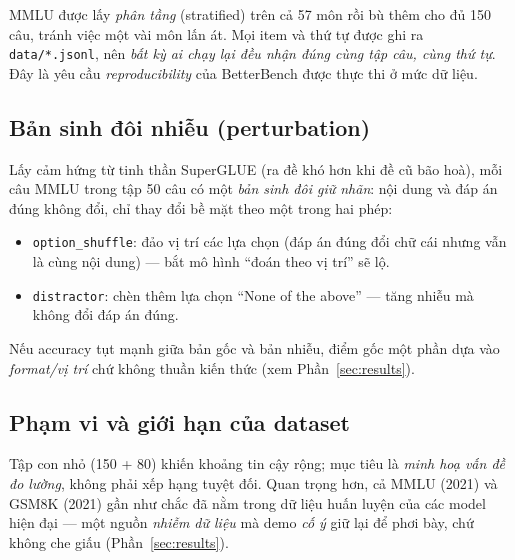 MMLU được lấy \emph{phân tầng} (stratified) trên cả 57 môn rồi bù thêm cho đủ 150
câu, tránh việc một vài môn lấn át. Mọi item và thứ tự được ghi ra
\texttt{data/*.jsonl}, nên \emph{bất kỳ ai chạy lại đều nhận đúng cùng tập câu, cùng
thứ tự}. Đây là yêu cầu \emph{reproducibility} của BetterBench được thực thi ở mức
dữ liệu.

\subsection{Bản sinh đôi nhiễu (perturbation)}

Lấy cảm hứng từ tinh thần SuperGLUE (ra đề khó hơn khi đề cũ bão hoà), mỗi câu MMLU
trong tập 50 câu có một \emph{bản sinh đôi giữ nhãn}: nội dung và đáp án đúng không
đổi, chỉ thay đổi bề mặt theo một trong hai phép:

\begin{itemize}
  \item \texttt{option\_shuffle}: đảo vị trí các lựa chọn (đáp án đúng đổi chữ cái
    nhưng vẫn là cùng nội dung) --- bắt mô hình ``đoán theo vị trí'' sẽ lộ.
  \item \texttt{distractor}: chèn thêm lựa chọn ``None of the above'' --- tăng
    nhiễu mà không đổi đáp án đúng.
\end{itemize}

Nếu accuracy tụt mạnh giữa bản gốc và bản nhiễu, điểm gốc một phần dựa vào
\emph{format/vị trí} chứ không thuần kiến thức (xem Phần~\ref{sec:results}).

\subsection{Phạm vi và giới hạn của dataset}

Tập con nhỏ (150 + 80) khiến khoảng tin cậy rộng; mục tiêu là \emph{minh hoạ vấn
đề đo lường}, không phải xếp hạng tuyệt đối. Quan trọng hơn, cả MMLU (2021) và
GSM8K (2021) gần như chắc đã nằm trong dữ liệu huấn luyện của các model hiện đại
--- một nguồn \emph{nhiễm dữ liệu} mà demo \emph{cố ý} giữ lại để phơi bày, chứ
không che giấu (Phần~\ref{sec:results}).
